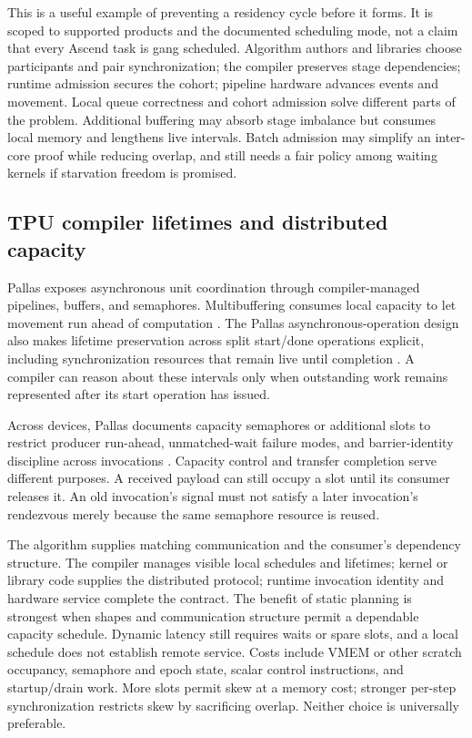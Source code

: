 This is a useful example of preventing a residency cycle before it forms. It is scoped to supported products and the documented scheduling mode, not a claim that every Ascend task is gang scheduled. Algorithm authors and libraries choose participants and pair synchronization; the compiler preserves stage dependencies; runtime admission secures the cohort; pipeline hardware advances events and movement. Local queue correctness and cohort admission solve different parts of the problem. Additional buffering may absorb stage imbalance but consumes local memory and lengthens live intervals. Batch admission may simplify an inter-core proof while reducing overlap, and still needs a fair policy among waiting kernels if starvation freedom is promised.

\subsection{TPU compiler lifetimes and distributed capacity}

Pallas exposes asynchronous unit coordination through compiler-managed pipelines, buffers, and semaphores. Multibuffering consumes local capacity to let movement run ahead of computation \citep{u007_pallas_pipeline}. The Pallas asynchronous-operation design also makes lifetime preservation across split start/done operations explicit, including synchronization resources that remain live until completion \citep{u008_pallas_async}. A compiler can reason about these intervals only when outstanding work remains represented after its start operation has issued.

Across devices, Pallas documents capacity semaphores or additional slots to restrict producer run-ahead, unmatched-wait failure modes, and barrier-identity discipline across invocations \citep{u007_pallas_distributed}. Capacity control and transfer completion serve different purposes. A received payload can still occupy a slot until its consumer releases it. An old invocation's signal must not satisfy a later invocation's rendezvous merely because the same semaphore resource is reused.

The algorithm supplies matching communication and the consumer's dependency structure. The compiler manages visible local schedules and lifetimes; kernel or library code supplies the distributed protocol; runtime invocation identity and hardware service complete the contract. The benefit of static planning is strongest when shapes and communication structure permit a dependable capacity schedule. Dynamic latency still requires waits or spare slots, and a local schedule does not establish remote service. Costs include VMEM or other scratch occupancy, semaphore and epoch state, scalar control instructions, and startup/drain work. More slots permit skew at a memory cost; stronger per-step synchronization restricts skew by sacrificing overlap. Neither choice is universally preferable.

